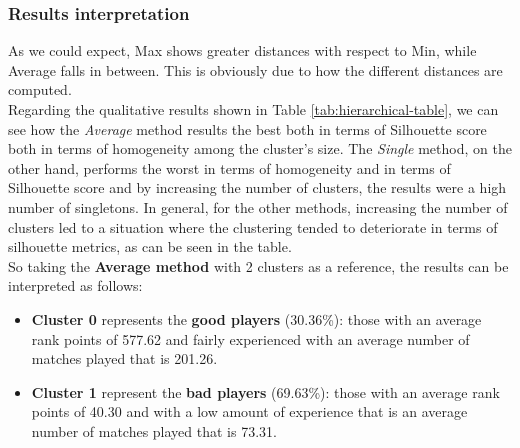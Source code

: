 \subsubsection{Results interpretation}
As we could expect, Max shows greater distances with respect to Min, while Average falls in between. This is obviously due to how the different distances are computed.\\
Regarding the qualitative results shown in Table \ref{tab:hierarchical-table}, we can see how the \textit{Average} method results the best both in terms of Silhouette score both in terms of homogeneity among the cluster's size. The \textit{Single} method, on the other hand, performs the worst in terms of homogeneity and in terms of Silhouette score and by increasing the number of clusters, the results were a high number of singletons. In general, for the other methods, increasing the number of clusters led to a situation where the clustering tended to deteriorate in terms of silhouette metrics, as can be seen in the table.\\
So taking the \textbf{Average method} with 2 clusters as a reference, the results can be interpreted as follows:
\begin{itemize}
	\item{ \textbf{Cluster 0} represents the \textbf{good players} (30.36\%): those with an average rank points of 577.62 and fairly experienced with an average number of matches played that is 201.26.}
	\item{ \textbf{Cluster 1} represent the \textbf{bad players} (69.63\%): those with an average rank points of 40.30 and with a low amount of experience that is an average number of matches played that is 73.31.}
\end{itemize}
